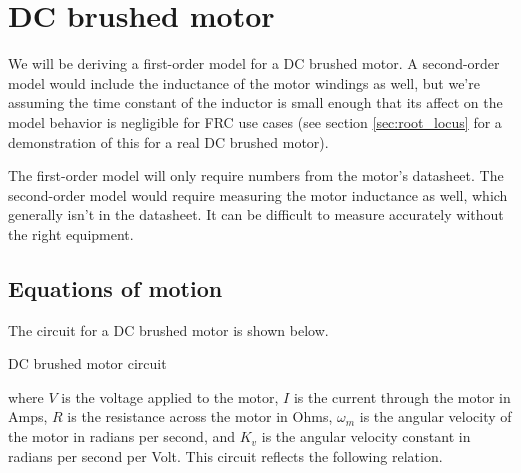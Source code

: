 \section{DC brushed motor}

We will be deriving a first-order model for a DC brushed motor. A second-order
model would include the inductance of the motor windings as well, but we're
assuming the time constant of the inductor is small enough that its affect on
the model behavior is negligible for FRC use cases (see section
\ref{sec:root_locus} for a demonstration of this for a real DC brushed motor).

The first-order model will only require numbers from the motor's datasheet. The
second-order model would require measuring the motor inductance as well, which
generally isn't in the datasheet. It can be difficult to measure accurately
without the right equipment.

\subsection{Equations of motion}

The circuit for a DC brushed motor is shown below.

\begin{bookfigure}

  \caption{DC brushed motor circuit}
  \label{fig:dc_motor_circuit}
\end{bookfigure}

where $V$ is the voltage applied to the motor, $I$ is the current through the
motor in Amps, $R$ is the resistance across the motor in Ohms, $\omega_m$ is the
angular velocity of the motor in radians per second, and $K_v$ is the angular
velocity constant in radians per second per Volt. This circuit reflects the
following relation.

